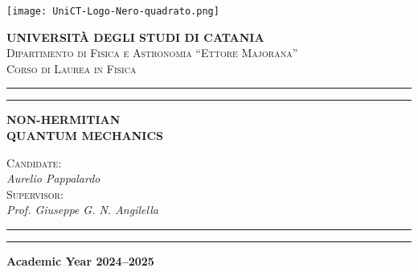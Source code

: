 \newcommand{\unictsize}{0.3\textwidth}
\newcommand{\dfasize}{0.6\textwidth}
\newcommand{\namesize}{0.8\textwidth}
\newcommand{\doublerule}{\hrule \vspace{3pt} \hrule}

\begin{titlingpage}
    \begin{center}
        \begin{minipage}[h!]{\linewidth}
            \begin{minipage}[ht!]{\linewidth}
                \centering
                \texttt{[image: UniCT-Logo-Nero-quadrato.png]}
            \end{minipage}
            \centering\large
            \textbf{UNIVERSITÀ DEGLI STUDI DI CATANIA}
            \\[5pt]
            \normalsize
            \textsc{Dipartimento di Fisica e Astronomia ``Ettore Majorana''}
            \\[5pt]
            \textsc{Corso di Laurea in Fisica}
            \\[10pt]
            \doublerule
        \end{minipage}
        \vfill
        {\Huge\bfseries NON-HERMITIAN\\[10pt]QUANTUM MECHANICS}
        \vfill
        \centering
        \large
        \begin{minipage}[h]{\namesize}
            \raggedleft
            \textsc{Candidate:}\\
            \textit{Aurelio Pappalardo}
            \\[10pt]
            \textsc{Supervisor:}\\
            \textit{Prof. Giuseppe G. N. Angilella}
        \end{minipage}
        \vspace{30pt}
        \doublerule
        \vspace{10pt}
        \normalsize
        \textbf{Academic Year 2024--2025}
    \end{center}
\end{titlingpage}
\restoregeometry